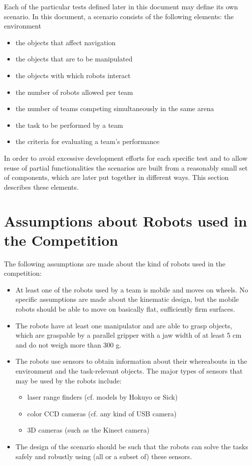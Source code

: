 
Each of the particular tests defined later in this document may define its own scenario. In this document, a scenario consists of the following elements:
the environment

\begin{itemize}
	\item the objects that affect navigation
	\item the objects that are to be manipulated
	\item the objects with which robots interact
	\item the number of robots allowed per team
	\item the number of teams competing simultaneously in the same arena
	\item the task to be performed by a team
	\item the criteria for evaluating a team’s performance
\end{itemize}

In order to avoid excessive development efforts for each specific test and to allow reuse of partial functionalities the scenarios are built from a reasonably small set of components, which are later put together in different ways. This section describes these elements.

\section{Assumptions about Robots used in the Competition}

The following assumptions are made about the kind of robots used in the competition:

\begin{itemize}

	\item At least one of the robots used by a team is mobile and moves on wheels. No specific assumptions are made about the kinematic design, but the mobile robots should be able to move on basically flat, sufficiently firm surfaces.
	\item The robots have at least one manipulator and are able to grasp objects, which are graspable by a parallel gripper with a jaw width of at least 5 cm and do not weigh more than 300 g.
	\item The robots use sensors to obtain information about their whereabouts in the environment and the task-relevant objects. The major types of sensors that may be used by the robots include:
	\begin{itemize}
		\item laser range finders (cf. models by Hokuyo or Sick)
		\item color CCD cameras (cf. any kind of USB camera)
		\item 3D cameras (such as the Kinect camera)
	\end{itemize}

	\item The design of the scenario should be such that the robots can solve the 	tasks safely and robustly using (all or a subset of) these sensors.

\end{itemize}




